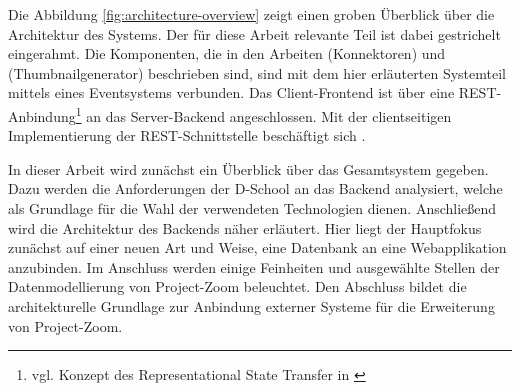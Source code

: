 Die Abbildung \ref{fig:architecture-overview} zeigt einen groben Überblick über die Architektur des Systems. Der für diese Arbeit relevante Teil ist dabei gestrichelt eingerahmt. Die Komponenten, die in den Arbeiten \cite{bp-tewe} (Konnektoren) und \cite{bp-dome} (Thumbnailgenerator) beschrieben sind, sind mit dem hier erläuterten Systemteil mittels eines Eventsystems verbunden. Das Client-Frontend ist über eine REST-Anbindung\footnote{vgl. Konzept des Representational State Transfer in \cite{rest}} an das Server-Backend angeschlossen. Mit der clientseitigen Implementierung der REST-Schnittstelle beschäftigt sich \cite{bp-norman}.

In dieser Arbeit wird zunächst ein Überblick über das Gesamtsystem gegeben. Dazu werden die Anforderungen der D-School an das Backend analysiert, welche als Grundlage für die Wahl der verwendeten Technologien dienen. Anschließend wird die Architektur des Backends näher erläutert. Hier liegt der Hauptfokus zunächst auf einer neuen Art und Weise, eine Datenbank an eine Webapplikation anzubinden. Im Anschluss werden einige Feinheiten und ausgewählte Stellen der Datenmodellierung von Project-Zoom beleuchtet. Den Abschluss bildet die architekturelle Grundlage zur Anbindung externer Systeme für die Erweiterung von Project-Zoom.

